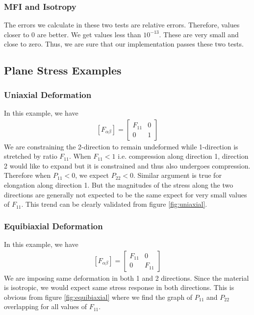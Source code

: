 \message{ !name(p1_2.tex)}\documentclass[../main.tex]{subfiles}
\begin{document}
\subsubsection{MFI and Isotropy}
The errors we calculate in these two tests are relative
errors. Therefore, values closer to $0$ are better. We get values less
than $10^{-13}$. These are very small and close to zero. Thus, we are
sure that our implementation passes these two tests.

\subsection{Plane Stress Examples}
\subsubsection{Uniaxial Deformation}
In this example, we have
\begin{align*}
  \left[F_{\alpha\beta}\right] =   \begin{bmatrix}F_{11} & 0\\ 0 & 1 \end{bmatrix}
\end{align*}
We are constraining the 2-direction to remain undeformed while
1-direction is stretched by ratio $F_{11}$. When $F_{11} < 1$
i.e. compression along direction 1, direction 2 would like to expand
but it is constrained and thus also undergoes compression. Therefore
when $P_{11} < 0$, we expect $P_{22} < 0$. Similar argument is true
for elongation along direction 1. But the magnitudes of the stress
along the two directions are generally not expected to be the same
expect for very small values of $F_{11}$. This trend can be clearly
validated from figure \ref{fig:uniaxial}.

\subsubsection{Equibiaxial Deformation}
In this example, we have
\begin{align*}
  \left[F_{\alpha\beta}\right] =   \begin{bmatrix}F_{11} & 0\\ 0 & F_{11} \end{bmatrix}
\end{align*}
We are imposing same deformation in both 1 and 2 directions. Since the
material is isotropic, we would expect same stress response in both
directions. This is obvious from figure \ref{fig:equibiaxial} where we
find the graph of $P_{11}$ and $P_{22}$ overlapping for all values of
$F_{11}$.
\end{document}
